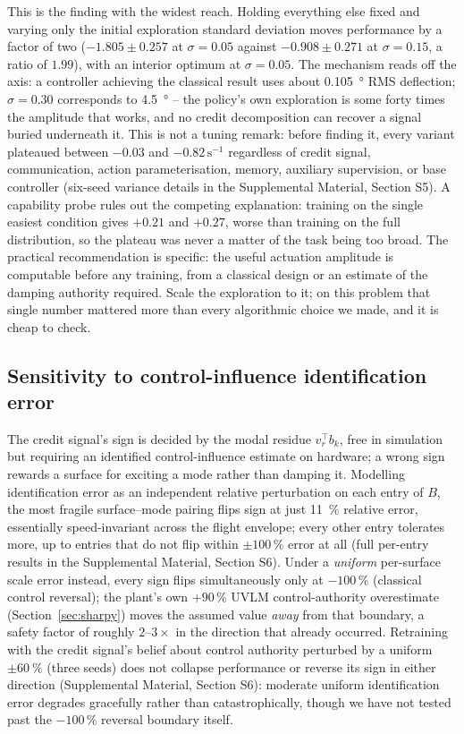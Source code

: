 \documentclass[journal]{new-aiaa}
\begin{document}
This is the finding with the widest reach. Holding everything else fixed
and varying only the initial exploration standard deviation moves
performance by a factor of two ($-1.805\pm0.257$ at $\sigma=0.05$ against
$-0.908\pm0.271$ at $\sigma=0.15$, a ratio of $1.99$), with an interior
optimum at $\sigma=0.05$. The mechanism reads off the axis: a controller
achieving the classical result uses about \SI{0.105}{\degree} RMS
deflection; $\sigma=0.30$ corresponds to \SI{4.5}{\degree} -- the policy's
own exploration is some forty times the amplitude that works, and no
credit decomposition can recover a signal buried underneath it. This is
not a tuning remark: before finding it, every variant plateaued between
$-0.03$ and $-0.82\,\mathrm{s}^{-1}$ regardless of credit signal,
communication, action parameterisation, memory, auxiliary supervision, or
base controller (six-seed variance details in the Supplemental Material,
Section S5). A capability probe rules out the competing explanation:
training on the single easiest condition gives $+0.21$ and $+0.27$, worse
than training on the full distribution, so the plateau was never a matter
of the task being too broad. The practical recommendation is specific: the
useful actuation amplitude is computable before any training, from a
classical design or an estimate of the damping authority required. Scale
the exploration to it; on this problem that single number mattered more
than every algorithmic choice we made, and it is cheap to check.

\subsection{Sensitivity to control-influence identification error}
\label{sec:credit-sensitivity}

The credit signal's sign is decided by the modal residue $v_r^{\top} b_k$,
free in simulation but requiring an identified control-influence estimate
on hardware; a wrong sign rewards a surface for exciting a mode rather
than damping it. Modelling identification error as an independent relative
perturbation on each entry of $B$, the most fragile surface--mode pairing
flips sign at just \SI{11}{\percent} relative error, essentially
speed-invariant across the flight envelope; every other entry tolerates
more, up to entries that do not flip within $\pm100\,\%$ error at all
(full per-entry results in the Supplemental Material, Section S6). Under a
\emph{uniform} per-surface scale error instead, every sign flips
simultaneously only at $-100\,\%$ (classical control reversal); the
plant's own $+90\,\%$ UVLM control-authority overestimate
(Section~\ref{sec:sharpy}) moves the assumed value \emph{away} from that
boundary, a safety factor of roughly $2$--$3\times$ in the direction that
already occurred. Retraining with the credit signal's belief about control
authority perturbed by a uniform $\pm\SI{60}{\percent}$ (three seeds) does
not collapse performance or reverse its sign in either direction
(Supplemental Material, Section S6): moderate uniform identification error
degrades gracefully rather than catastrophically, though we have not
tested past the $-100\,\%$ reversal boundary itself.
\end{document}
